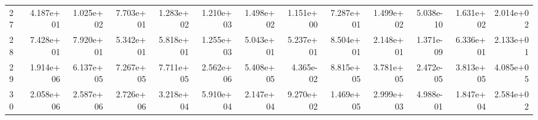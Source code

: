 \begin{table}
\begin{tabular}{lrrrrrrrrrrrr}
27 & 4.187e+01 & 1.025e+02 & 7.703e+01 & 1.283e+02 & 1.210e+03 & 1.498e+02 & 1.151e+00 & 7.287e+01 & 1.499e+02 & 5.038e-10 & 1.631e+02 & 2.014e+02 \\
28 & 7.428e+01 & 7.920e+01 & 5.342e+01 & 5.818e+01 & 1.255e+03 & 5.043e+01 & 5.237e+01 & 8.504e+01 & 2.148e+01 & 1.371e-09 & 6.336e+01 & 2.133e+01 \\
29 & 1.914e+06 & 6.137e+05 & 7.267e+05 & 7.711e+05 & 2.562e+06 & 5.408e+05 & 4.365e-02 & 8.815e+05 & 3.781e+05 & 2.472e-05 & 3.813e+05 & 4.085e+05 \\
30 & 2.058e+06 & 2.587e+06 & 2.726e+06 & 3.218e+04 & 5.910e+04 & 2.147e+04 & 9.270e+02 & 1.469e+05 & 2.999e+03 & 4.988e-01 & 1.847e+04 & 2.584e+02 \\
\bottomrule
\end{tabular}
\end{table}
